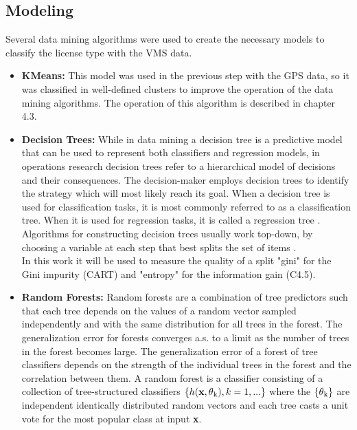 \subsection{Modeling} %
\label{sub:modeling}
Several data mining algorithms were used to create the necessary models to classify the license type with the VMS data.
\begin{itemize}
\item \textbf{ KMeans:} This model was used in the previous step with the GPS data, so it was classified in well-defined clusters to improve the operation of the data mining algorithms. The operation of this algorithm is described in chapter 4.3.

\item \textbf{ Decision Trees: }
While in data mining a decision tree is a predictive model that can be used to represent both classifiers and regression models, in operations research decision trees refer to a hierarchical model of decisions and their consequences. The decision-maker employs decision trees to identify the strategy which will most likely reach its goal. When a decision tree is used for classification tasks, it is most commonly referred to as a classification tree. When it is used for regression tasks, it is called a regression tree \cite{Rokach2014}.
Algorithms for constructing decision trees usually work top-down, by choosing a variable at each step that best splits the set of items \cite{ApplicationsReviews}.\\
In this work it will be used to measure the quality of a split "gini" for the Gini impurity (CART)\cite{DTAnalysis} and "entropy" for the information gain (C4.5)\cite{DTAnalysis}.

\item \textbf{ Random Forests: }
Random forests are a combination of tree predictors such that each tree depends on the values of a random vector sampled independently and with the same distribution for all trees in the forest\cite{Breiman2001}. The generalization error for forests converges a.s. to a limit as the number of trees in the forest becomes large. The generalization error of a forest of tree classifiers depends on the strength of the individual trees in the forest and the correlation between them.
A random forest is a classifier consisting of a collection of tree-structured
classifiers \(\{h(\textbf{x}, \theta \textsubscript{k} ), k = 1,...\}\) where the  \( \{ \theta \textsubscript{k} \}\) are independent identically distributed
random vectors and each tree casts a unit vote for the most popular class at input \textbf{x}\cite{Breiman2001}.



\end{itemize}

